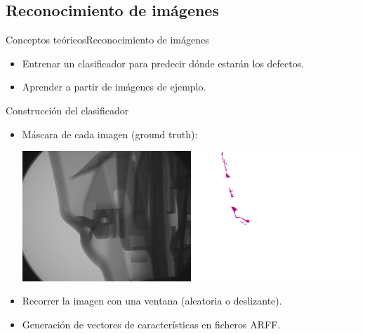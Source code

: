 \documentclass[10pt]{beamer}
\begin{document}
\subsection{Reconocimiento de imágenes}
\begin{frame}{Conceptos teóricos}{Reconocimiento de imágenes}

\begin{itemize}
\item Entrenar un clasificador para predecir dónde estarán los defectos.
\item Aprender a partir de imágenes de ejemplo.
\end{itemize}

\pause

\begin{block}{Construcción del clasificador}
\begin{itemize}
\item Máscara de cada imagen (\alert{ground truth}):\newline

{\centering \includegraphics[scale=0.15]{AAUgraphics/mascara.png}\par}

\item Recorrer la imagen con una \alert{ventana} (aleatoria o deslizante).
\item Generación de vectores de características en ficheros \alert{ARFF}.

\end{itemize}
\end{block}

\end{frame}
\end{document}
